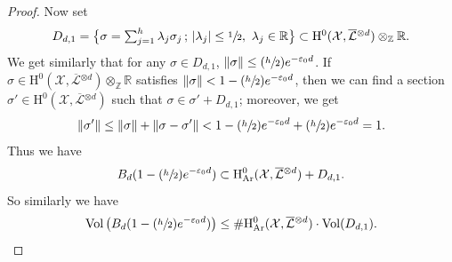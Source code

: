\documentclass[JEP,XML,SOM,Unicode,published]{cedram}
\newcommand{\Psfrac}[2]{(\sfrac{#1}{#2})}
\newcommand{\sep}{\,;\,}
\theoremstyle{plain}
\theoremstyle{definition}
\newcommand{\ho}{\mathrm{H}}
\newcommand{\X}{\mathcal{X}}
\newcommand{\Li}{\overline{\mathcal{L}}{}}
\begin{document}
\begin{proof}[Proof]
Now set
\[\textstyle
D_{d,1}=\bigl\{ \sigma=\sum_{j=1}^{h}\lambda_j \sigma_j\sep |\lambda_j|\leq \sfrac{1}{2},\ \lambda_j\in \mathbb{R} \bigr\}\subset \ho^0(\X,\Li^{\otimes d})\otimes_{ \mathbb{Z}}\mathbb{R}.
\]
We get similarly that for any $\sigma\in D_{d,1}$, $\lVert \sigma\rVert \leq \Psfrac{h}{2}e^{-\varepsilon_0 d}$.
If $\sigma\in \ho^0(\X,\Li^{\otimes d})\otimes_{ \mathbb{Z}}\mathbb{R}$ satisfies $\lVert\sigma\rVert <1-\Psfrac{h}{2}e^{-\varepsilon_0 d}$, then we can find a section $\sigma'\in \ho^0(\X,\Li^{\otimes d})$ such that $\sigma\in \sigma'+D_{d, 1}$; moreover, we get
\[
\lVert \sigma' \rVert \leq \lVert \sigma \rVert + \lVert \sigma-\sigma' \rVert <1-\Psfrac{h}{2}e^{-\varepsilon_0 d}+\Psfrac{h}{2}e^{-\varepsilon_0 d}=1.
\]
Thus we have
\[
B_d(1-\Psfrac{h}{2}e^{-\varepsilon_0 d})\subset \ho^0_{\mathrm{Ar}}(\X,\Li^{\otimes d})+D_{d,1}.
\]
So similarly we have
\[
\mathrm{Vol} \left(B_d(1-\Psfrac{h}{2}e^{-\varepsilon_0 d}) \right)\leq \#\ho^0_{\mathrm{Ar}}(\X,\Li^{\otimes d})\cdot \mathrm{Vol}(D_{d,1}).
\]


\end{proof}
\end{document}
